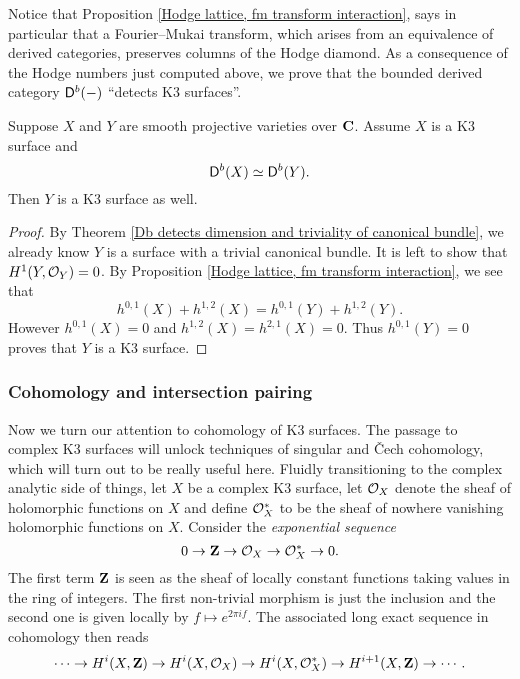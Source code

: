 Notice that Proposition \ref{Hodge lattice, fm transform interaction}, says in particular that a Fourier--Mukai transform, which arises from an equivalence of derived categories, preserves columns of the Hodge diamond. As a consequence of the Hodge numbers just computed above, we prove that the bounded derived category $\mathsf{D}^b(-)$ ``detects K3 surfaces''.

\begin{theorem}
    \label{Db(-) detects K3}
    Suppose $X$ and $Y$ are smooth projective varieties over $\mathbf C$. Assume $X$ is a K3 surface and
    \[
        \mathsf{D}^b(X) \simeq \mathsf{D}^b(Y).
    \]
    Then $Y$ is a K3 surface as well. 
\end{theorem}

\begin{proof}
    By Theorem \ref{Db detects dimension and triviality of canonical bundle}, we already know $Y$ is a surface with a trivial canonical bundle. It is left to show that $H^{1}(Y, {\mathcal{O}_{Y}}) = 0$. By Proposition \ref{Hodge lattice, fm transform interaction}, we see that 
    \[
        h^{0,1}(X) + h^{1,2}(X) = h^{0,1}(Y) + h^{1,2}(Y). 
    \]
    However $h^{0,1}(X) = 0$ and $h^{1,2}(X) = h^{2,1}(X) = 0$.
    Thus $h^{0,1}(Y) = 0$ proves that $Y$ is a K3 surface.
\end{proof}

\subsubsection*{Cohomology and intersection pairing}

Now we turn our attention to cohomology of K3 surfaces. The passage to complex K3 surfaces will unlock techniques of singular and Čech cohomology, which will turn out to be really useful here. Fluidly transitioning to the complex analytic side of things, let $X$ be a complex K3 surface, let ${\mathcal{O}_{X}}$ denote the sheaf of holomorphic functions on $X$ and define $\mathcal O_X^*$ to be the sheaf of nowhere vanishing holomorphic functions on $X$. Consider the \emph{exponential sequence}
\[
    0 \to \mathbf Z \to {\mathcal{O}_{X}} \to \mathcal O_X^* \to 0.
\]
The first term $\mathbf Z$ is seen as the sheaf of locally constant functions taking values in the ring of integers. The first non-trivial morphism is just the inclusion and the second one is given locally by $f \mapsto e^{2\pi i f}$. The associated long exact sequence in
cohomology then reads
\begin{equation}
    \label{eq: LES of exponential SES}
    \cdots \to H^{i}(X, \mathbf Z) \to H^{i}(X, {\mathcal{O}_{X}}) \to H^{i}(X, \mathcal O^*_X) \to H^{i+1}(X, \mathbf Z) \to \cdots.
\end{equation}

